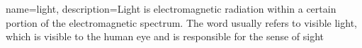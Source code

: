 {
    name=light,
    description={Light is electromagnetic radiation within a certain portion of the electromagnetic spectrum. The word usually refers to visible light, which is visible to the human eye and is responsible for the sense of sight}
}
